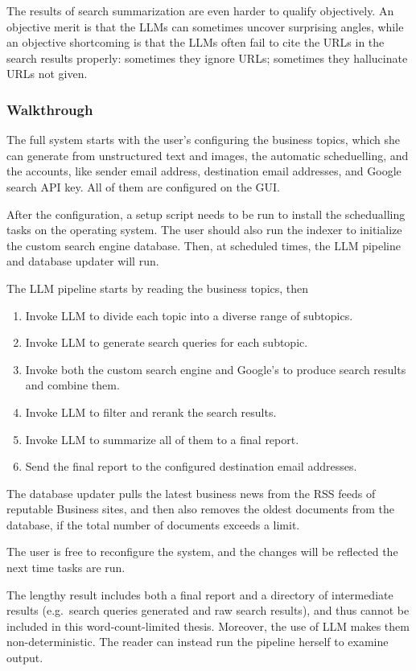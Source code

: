 \documentclass[final-report]{report-template}
\begin{document}
The results of search summarization are even harder to qualify objectively. An
objective merit is that the LLMs can sometimes uncover surprising angles, while
an objective shortcoming is that the LLMs often fail to cite the URLs in the
search results properly: sometimes they ignore URLs; sometimes they hallucinate
URLs not given.

\subsubsection{Walkthrough}
The full system starts with the user's configuring the business topics, which
she can generate from unstructured text and images, the automatic scheduelling,
and the accounts, like sender email address, destination email addresses, and
Google search API key. All of them are configured on the GUI.

After the configuration, a setup script needs to be run to install the
schedualling tasks on the operating system. The user should also run the
indexer to initialize the custom search engine database. Then, at scheduled
times, the LLM pipeline and database updater will run.

The LLM pipeline starts by reading the business topics, then
\begin{enumerate}
	\item Invoke LLM to divide each topic into a diverse range of subtopics.
	\item Invoke LLM to generate search queries for each subtopic.
	\item Invoke both the custom search engine and Google's to produce search
		results and combine them.
	\item Invoke LLM to filter and rerank the search results.
	\item Invoke LLM to summarize all of them to a final report.
	\item Send the final report to the configured destination email addresses.
\end{enumerate}

The database updater pulls the latest business news from the RSS feeds of
reputable Business sites, and then also removes the oldest documents from the
database, if the total number of documents exceeds a limit.

The user is free to reconfigure the system, and the changes will be reflected
the next time tasks are run.

The lengthy result includes both a final report and a directory of intermediate
results (e.g.\ search queries generated and raw search results), and thus
cannot be included in this word-count-limited thesis. Moreover, the use of LLM
makes them non-deterministic. The reader can instead run the pipeline herself
to examine output.
\end{document}
